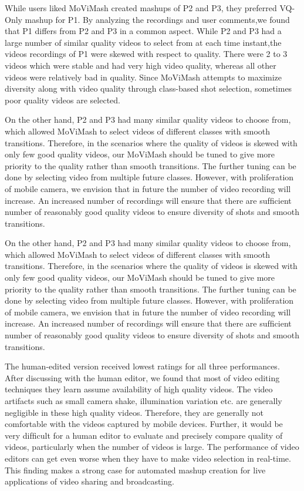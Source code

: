 \documentclass{sig-alternate}
\begin{document}
While users liked MoViMash created mashups of P2 and P3, they preferred VQ-Only mashup for P1. By analyzing the recordings and user comments,we found that P1 differs from P2 and P3 in a common aspect. While P2 and P3 had a large number of similar quality videos to select from at each time instant,the videos recordings of P1 were skewed with respect to quality. There were 2 to 3 videos which were stable and had very high video quality, whereas all other videos were relatively bad in quality. Since MoViMash attempts to maximize diversity along with video quality through class-based shot selection, sometimes poor quality videos are selected. 



On the other hand, P2 and P3 had many similar quality videos to choose from, which allowed MoViMash to select videos of different classes with smooth transitions. Therefore, in the scenarios where the quality of videos is skewed with only few good quality videos, our MoViMash should be tuned to give more priority to the quality rather than smooth transitions. The further tuning can be done by selecting video from multiple future classes. However, with proliferation of mobile camera, we envision that in future the number of video recording will increase. An increased number of recordings will ensure that there are sufﬁcient number of reasonably good quality videos to ensure diversity of shots and smooth transitions. 

On the other hand, P2 and P3 had many similar quality videos to choose from, which allowed MoViMash to select videos of different classes with smooth transitions. Therefore, in the scenarios where the quality of videos is skewed with only few good quality videos, our MoViMash should be tuned to give more priority to the quality rather than smooth transitions. The further tuning can be done by selecting video from multiple future classes. However, with proliferation of mobile camera, we envision that in future the number of video recording will increase. An increased number of recordings will ensure that there are sufﬁcient number of reasonably good quality videos to ensure diversity of shots and smooth transitions. 

The human-edited version received lowest ratings for all three performances. After discussing with the human editor, we found that most of video editing techniques they learn assume availability of high quality videos. The video artifacts such as small camera shake, illumination variation etc. are generally negligible in these high quality videos. Therefore, they are generally not comfortable with the videos captured by mobile devices. Further, it would be very difﬁcult for a human editor to evaluate and precisely compare quality of videos, particularly when the number of videos is large. The performance of video editors can get even worse when they have to make video selection in real-time. This ﬁnding makes a strong case for automated mashup creation for live applications of video sharing and broadcasting. 
\end{document}
